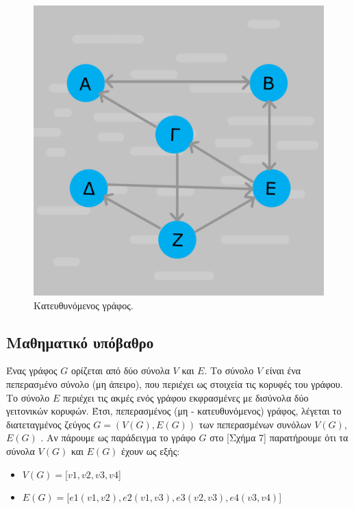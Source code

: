 \begin{figure}[h]
\begin{minipage}[c]{.46\linewidth}
        \includegraphics[scale=0.15]{2947_thesis/pictures/directed.png} 
        \caption{Κατευθυνόμενος γράφος.}
    \end{minipage}
\end{figure}

\subsection{Μαθηματικό υπόβαθρο}
Ένας γράφος $G$ ορίζεται από δύο σύνολα $V$ και $E$. Το σύνολο $V$ είναι ένα πεπερασµένο σύνολο (μη άπειρο), που περιέχει ως στοιχεία τις κορυφές του γράφου. Το σύνολο $E$ περιέχει τις ακμές ενός γράφου εκφρασμένες με δισύνολα δύο γειτονικών κορυφών. Έτσι, πεπερασμένος (μη - κατευθυνόμενος) γράφος, λέγεται το διατεταγμένος ζεύγος $G = (V(G), E(G))$ των πεπερασμένων συνόλων $V(G)$, $E(G)$ \cite{Ντενισιώτης}. Αν πάρουμε ως παράδειγμα το γράφο $G$ στο [Σχήμα 7] παρατήρουμε ότι τα σύνολα $V(G)$ και $E(G)$ έχουν ως εξής: 
\begin{itemize}
  \item $V(G)=$[$v1,v2,v3,v4$]
  \item $E(G)=$[$e1(v1,v2),e2(v1,v3),e3(v2,v3),e4(v3,v4)$] 
\end{itemize}

